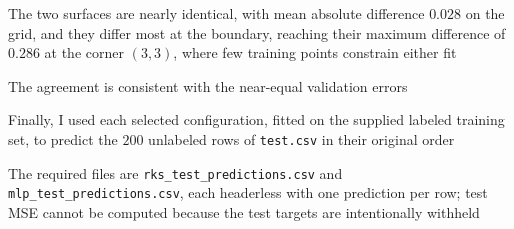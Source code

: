\documentclass{article}
\begin{document}
\begin{enumerate}[label=\alph*.]
The two surfaces are nearly identical, with mean absolute difference $0.028$ on the grid, and they differ most at the boundary, reaching their maximum difference of $0.286$ at the corner $(3,3)$, where few training points constrain either fit

The agreement is consistent with the near-equal validation errors

Finally, I used each selected configuration, fitted on the supplied labeled training set, to predict the $200$ unlabeled rows of \texttt{test.csv} in their original order

The required files are \texttt{rks\_test\_predictions.csv} and \texttt{mlp\_test\_predictions.csv}, each headerless with one prediction per row; test MSE cannot be computed because the test targets are intentionally withheld
\end{enumerate}
\end{document}
